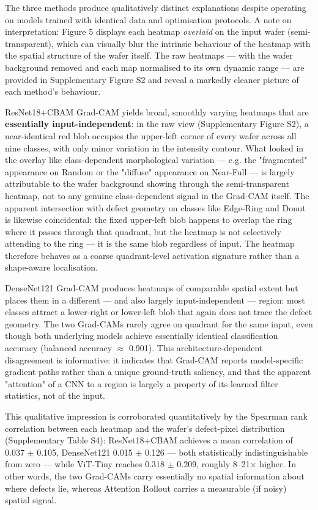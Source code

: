 \documentclass[11pt,a4paper]{article}
\begin{document}
The three methods produce qualitatively distinct explanations despite operating on models trained with identical data and optimisation protocols. A note on interpretation: Figure 5 displays each heatmap \emph{overlaid} on the input wafer (semi-transparent), which can visually blur the intrinsic behaviour of the heatmap with the spatial structure of the wafer itself. The raw heatmaps --- with the wafer background removed and each map normalised to its own dynamic range --- are provided in Supplementary Figure S2 and reveal a markedly cleaner picture of each method's behaviour.

ResNet18+CBAM Grad-CAM yields broad, smoothly varying heatmaps that are \textbf{essentially input-independent}: in the raw view (Supplementary Figure S2), a near-identical red blob occupies the upper-left corner of every wafer across all nine classes, with only minor variation in the intensity contour. What looked in the overlay like class-dependent morphological variation --- e.g. the "fragmented" appearance on Random or the "diffuse" appearance on Near-Full --- is largely attributable to the wafer background showing through the semi-transparent heatmap, not to any genuine class-dependent signal in the Grad-CAM itself. The apparent intersection with defect geometry on classes like Edge-Ring and Donut is likewise coincidental: the fixed upper-left blob happens to overlap the ring where it passes through that quadrant, but the heatmap is not selectively attending to the ring --- it is the
same blob regardless of input. The heatmap therefore behaves as a coarse quadrant-level activation signature rather than a shape-aware localisation.

DenseNet121 Grad-CAM produces heatmaps of comparable spatial extent but places them in a different --- and also largely input-independent --- region: most classes attract a lower-right or lower-left blob that again does not trace the defect geometry. The two Grad-CAMs rarely agree on quadrant for the same input, even though both underlying models achieve essentially identical classification accuracy (balanced accuracy $\approx$ 0.901). This architecture-dependent disagreement is informative: it indicates that Grad-CAM reports model-specific gradient paths rather than a unique ground-truth saliency, and that the apparent "attention" of a CNN to a region is largely a property of its learned filter statistics, not of the input.

This qualitative impression is corroborated quantitatively by the Spearman rank correlation between each heatmap and the wafer's defect-pixel distribution (Supplementary Table S4): ResNet18+CBAM achieves a mean correlation of 0.037 $\pm$ 0.105, DenseNet121 0.015 $\pm$ 0.126 --- both statistically indistinguishable from zero --- while ViT-Tiny reaches 0.318 $\pm$ 0.209, roughly 8--21$\times$ higher. In other words, the two Grad-CAMs carry essentially no spatial information about where defects lie, whereas Attention Rollout carries a measurable (if noisy) spatial signal.
\end{document}
